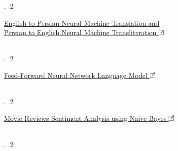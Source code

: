 \documentclass[]{rahulworld-resume}
\begin{document}
\begin{minipage}[t]{0.97\textwidth}
\begin{minipage}{\linewidth}
{\begin{minipage}{0.84\textwidth}
			\end{minipage}.
			.2  \begin{minipage}{0.84\textwidth}\vspace{3pt}\normalfont
				\large\href{https://github.com/BehzadShayegh/NMT}{English to Persian Neural Machine Translation and\\Persian to English Neural Machine Transliteration \includegraphics[width=8pt]{icons/redirect.png}}
				\\\vspace{3pt}
				\normalfont\normalsize{}
				\\\vspace{3pt}
			\end{minipage}.
			.2  \begin{minipage}{0.84\textwidth}\vspace{3pt}\normalfont
				\large\href{https://github.com/BehzadShayegh/FeedForwardNeuralNetworkLanguageModel}{Feed-Forward Neural Network Language Model \includegraphics[width=8pt]{icons/redirect.png}}
				\\\vspace{3pt}
				\normalfont\normalsize{}
				\\\vspace{3pt}
			\end{minipage}.
			.2  \begin{minipage}{0.84\textwidth}\vspace{3pt}\normalfont
				\large\href{https://github.com/BehzadShayegh/MovieReviewsSentimentAnalysis}{Movie Reviews Sentiment Analysis using Naive Bayes \includegraphics[width=8pt]{icons/redirect.png}}
				\\\vspace{3pt}
				\normalfont\normalsize{}
				\\\vspace{3pt}
			\end{minipage}.
			.2  \begin{minipage}{0.84\textwidth}\vspace{3pt}\normalfont

\end{minipage}}
\end{minipage}
\end{minipage}
\end{document}
